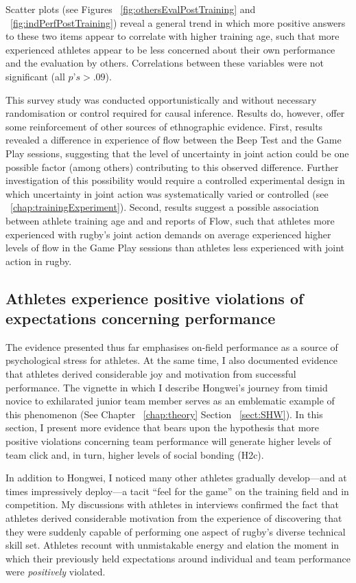 \begin{CJK}{UTF8}{gbsn}
Scatter plots (see Figures ~\ref{fig:othersEvalPostTraining} and ~\ref{fig:indPerfPostTraining}) reveal a general trend in which more positive answers to these two items appear to correlate with higher training age, such that more experienced athletes appear to be less concerned about their own performance and the evaluation by others.  Correlations between these variables were not significant (all $p’s > .09$).

This survey study was conducted opportunistically and without necessary randomisation or control required for causal inference.  Results do, however, offer some reinforcement of other sources of ethnographic evidence.  First, results revealed a difference in experience of flow between the Beep Test and the Game Play sessions, suggesting that the level of uncertainty in joint action could be one possible factor (among others) contributing to this observed difference.  Further investigation of this possibility would require a controlled experimental design in which uncertainty in joint action was systematically varied or controlled (see ~\ref{chap:trainingExperiment}).  Second, results suggest a possible association between athlete training age and and reports of Flow, such that athletes more experienced with rugby’s joint action demands on average experienced higher levels of flow in the Game Play sessions than athletes less experienced with joint action in rugby.




\subsection{Athletes experience positive violations of expectations concerning performance\label{sect:expectationViolation}}
The evidence presented thus far emphasises on-field performance as a source of psychological stress for athletes.  At the same time, I also documented evidence that athletes derived considerable joy and motivation from successful performance.  The vignette in which I describe Hongwei's journey from timid novice to exhilarated junior team member serves as an emblematic example of this phenomenon (See Chapter ~\ref{chap:theory} Section ~\ref{sect:SHW}).  In this section, I present more evidence that bears upon the hypothesis that more positive violations concerning team performance will generate higher levels of team click and, in turn, higher levels of social bonding (H2c).

In addition to Hongwei, I noticed many other athletes gradually develop---and at times impressively deploy---a tacit ``feel for the game'' on the training field and in competition.  My discussions with athletes in interviews confirmed the fact that athletes derived considerable motivation from the experience of discovering that they were suddenly capable of performing one aspect of rugby's diverse technical skill set.  Athletes recount with unmistakable energy and elation the moment in which their previously held expectations around individual and team performance were \textit{positively} violated.


\end{CJK}
